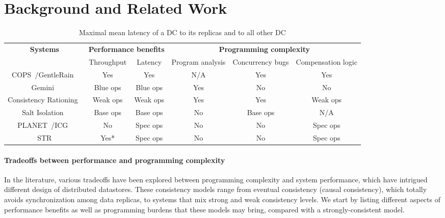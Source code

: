 \section{Background and Related Work}
\begin{table*}
\small
\begin{center}
  \begin{tabular}{ c | c | c | c | c | c } 
      \multirow{2}{*}{\textbf{Systems}} & \multicolumn{2}{c|}{\textbf{Performance benefits}} &  \multicolumn{3}{c}{\textbf{Programming complexity}}   \\ \hhline{~-----}
       & Throughput & Latency & Program analysis & Concurrency bugs & Compensation logic \\ \hline
       COPS~\cite{lloyd2011don}/GentleRain~\cite{du2014gentlerain} &  Yes & Yes & N/A & Yes & Yes \\ \hline
       Gemini~\cite{li2012making} & Blue ops & Blue ops & Yes & No & No \\ \hline
       Consistency Rationing~\cite{kraska2009consistency} & Weak ops & Weak ops & Yes & Yes & Weak ops \\ \hline
       Salt Isolation~\cite{xie2014salt} & Base ops & Base ops & No & Base ops & N/A \\ \hline
       PLANET~\cite{pang2014planet}/ICG~\cite{icg} &  No  & Spec ops  & No & No & Spec ops \\ \hline
       STR &  Yes*  & Spec ops & No & No & Spec ops \\ \hline
  \end{tabular}
\end{center}
\caption{Maximal mean latency of a DC to its replicas and to all other DC}
\label{tab:related}
\end{table*}

\paragraph{Tradeoffs between performance and programming complexity} In the literature, various tradeoffs have been explored between programming complexity and system performance, which have intrigued different design of distributed datastores. These consistency models range from eventual consistency (causal consistency), which totally avoids synchronization among data replicas, to systems that mix strong and weak consistency levels. We start by listing different aspects of performance benefits as well as programming burdens that these models may bring, compared with a strongly-consistent model.


